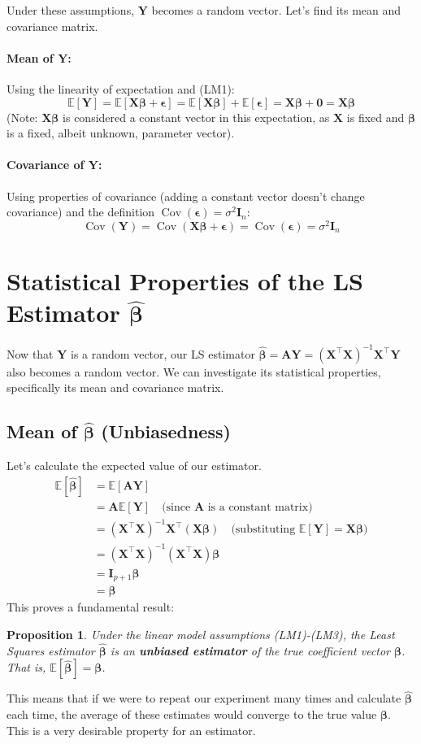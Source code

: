 \documentclass[11pt, letterpaper]{article}
\theoremstyle{definition}
\theoremstyle{plain} %
\newtheorem{proposition}[definition]{Proposition} %
\theoremstyle{remark}
\newcommand{\E}{\mathbb{E}}            %
\newcommand{\Cov}{\operatorname{Cov}}  %
\newcommand{\vb}[1]{\bm{#1}}          %
\newcommand{\mb}[1]{\bm{#1}}          %
\newcommand{\Yvec}{\vb{Y}}            %
\newcommand{\Xmat}{\mb{X}}            %
\newcommand{\Amat}{\mb{A}}            %
\newcommand{\Imat}{\mb{I}}            %
\newcommand{\betavec}{\vb{\beta}}     %
\newcommand{\epsilonvec}{\vb{\epsilon}}%
\newcommand{\betahatvec}{\vb{\hat{\beta}}}%
\newcommand{\zerovec}{\vb{0}}        %
\begin{document}
Under these assumptions, $\Yvec$ becomes a random vector. Let's find its mean and covariance matrix.

\paragraph{Mean of $\Yvec$:}
Using the linearity of expectation and (LM1):
\[
\E[\Yvec] = \E[\Xmat \betavec + \epsilonvec] = \E[\Xmat \betavec] + \E[\epsilonvec] = \Xmat \betavec + \zerovec = \Xmat \betavec
\]
(Note: $\Xmat\betavec$ is considered a constant vector in this expectation, as $\Xmat$ is fixed and $\betavec$ is a fixed, albeit unknown, parameter vector).

\paragraph{Covariance of $\Yvec$:}
Using properties of covariance (adding a constant vector doesn't change covariance) and the definition $\Cov(\epsilonvec) = \sigma^2 \Imat_n$:
\[
\Cov(\Yvec) = \Cov(\Xmat \betavec + \epsilonvec) = \Cov(\epsilonvec) = \sigma^2 \Imat_n
\]

\section{Statistical Properties of the LS Estimator \texorpdfstring{$\betahatvec$}{beta-hat}}

Now that $\Yvec$ is a random vector, our LS estimator $\betahatvec = \Amat \Yvec = (\Xmat^\top \Xmat)^{-1} \Xmat^\top \Yvec$ also becomes a random vector. We can investigate its statistical properties, specifically its mean and covariance matrix.

\subsection{Mean of \texorpdfstring{$\betahatvec$}{beta-hat} (Unbiasedness)}

Let's calculate the expected value of our estimator.
\begin{align*}
\E[\betahatvec] &= \E[\Amat \Yvec] \\
&= \Amat \E[\Yvec] \quad \text{(since } \Amat \text{ is a constant matrix)} \\
&= (\Xmat^\top \Xmat)^{-1} \Xmat^\top (\Xmat \betavec) \quad \text{(substituting } \E[\Yvec] = \Xmat\betavec \text{)} \\
&= (\Xmat^\top \Xmat)^{-1} (\Xmat^\top \Xmat) \betavec \\
&= \Imat_{p+1} \betavec \\
&= \betavec
\end{align*}
This proves a fundamental result:
\begin{proposition}
Under the linear model assumptions (LM1)-(LM3), the Least Squares estimator $\betahatvec$ is an \textbf{unbiased estimator} of the true coefficient vector $\betavec$. That is, $\E[\betahatvec] = \betavec$.
\end{proposition}
This means that if we were to repeat our experiment many times and calculate $\betahatvec$ each time, the average of these estimates would converge to the true value $\betavec$. This is a very desirable property for an estimator.
\end{document}
